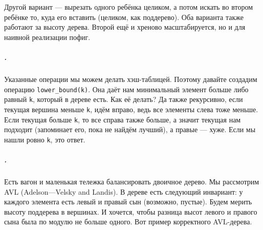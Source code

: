 \documentclass{article}
\newcommand{\pseudo}{PseudoLexer.py:PseudoLexer -x}
\newcommand{\pseudocode}[1]{\texttt{#1}}
\begin{document}
    Другой вариант --- вырезать одного ребёнка целиком, а потом искать во втором ребёнке то, куда его вставить (целиком, как поддерево). Оба варианта также работают за высоту дерева. Второй ещё и хреново масштабируется, но и для наивной реализации пофиг.
    \subparagraph{.}
    Указанные операции мы можем делать хэш-таблицей. Поэтому давайте создадим операцию \pseudocode{lower_bound(k)}. Она даёт нам минимальный элемент больше либо равный \pseudocode{k}, который в дереве есть. Как её делать? Да также рекурсивно, если текущая вершина меньше \pseudocode{k}, идём вправо, ведь все элементы слева тоже меньше. Если текущая больше \pseudocode{k}, то все справа также больше, а значит текущая нам подходит (запоминает его, пока не найдём лучший), а правые --- хуже. Если мы нашли ровно \pseudocode{k}, это ответ.
    \subparagraph{.}
    Есть вагон и маленькая тележка балансировать двоичное дерево. Мы рассмотрим AVL (Adelson---Velsky and Landis). В дереве есть следующий инвариант: у каждого элемента есть левый и правый сын (возможно, пустые). Будем мерить высоту поддерева в вершинах. И хочется, чтобы разница высот левого и правого сына была по модулю не больше одного. Вот пример корректного AVL-дерева.
    \begin{center}
    \end{center}
\end{document}

